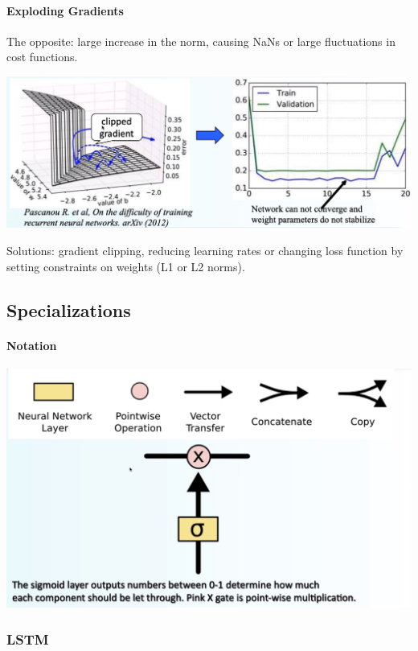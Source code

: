 \documentclass[10pt]{report}
\begin{document}
\paragraph{Exploding Gradients} The opposite: large increase in the norm, causing NaNs or large fluctuations in cost functions.
\begin{center}
	\includegraphics[scale=0.4]{29.png}
\end{center}
Solutions: gradient clipping, reducing learning rates or changing loss function by setting constraints on weights (L1 or L2 norms).
\subsection{Specializations}
\paragraph{Notation}\begin{center}
	\includegraphics[scale=0.33]{30.png}
\end{center}
\subsubsection{LSTM}
\end{document}
